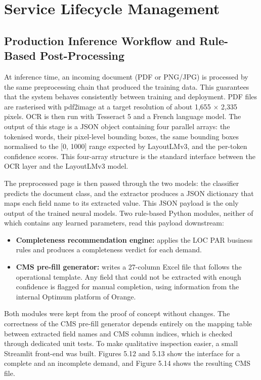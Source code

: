 \section{Service Lifecycle Management}

\subsection{Production Inference Workflow and Rule-Based Post-Processing}

At inference time, an incoming document (PDF or PNG/JPG) is processed by the same preprocessing chain that produced the training data. This guarantees that the system behaves consistently between training and deployment. PDF files are rasterised with pdf2image at a target resolution of about 1,655 $\times$ 2,335 pixels. OCR is then run with Tesseract 5 and a French language model. The output of this stage is a JSON object containing four parallel arrays: the tokenised words, their pixel-level bounding boxes, the same bounding boxes normalised to the [0, 1000] range expected by LayoutLMv3, and the per-token confidence scores. This four-array structure is the standard interface between the OCR layer and the LayoutLMv3 model.

The preprocessed page is then passed through the two models: the classifier predicts the document class, and the extractor produces a JSON dictionary that maps each field name to its extracted value. This JSON payload is the only output of the trained neural models. Two rule-based Python modules, neither of which contains any learned parameters, read this payload downstream:

\begin{itemize}
  \item \textbf{Completeness recommendation engine:} applies the LOC PAR business rules and produces a completeness verdict for each demand.
  \item \textbf{CMS pre-fill generator:} writes a 27-column Excel file that follows the operational template. Any field that could not be extracted with enough confidence is flagged for manual completion, using information from the internal Optimum platform of Orange.
\end{itemize}

Both modules were kept from the proof of concept without changes. The correctness of the CMS pre-fill generator depends entirely on the mapping table between extracted field names and CMS column indices, which is checked through dedicated unit tests. To make qualitative inspection easier, a small Streamlit front-end was built. Figures 5.12 and 5.13 show the interface for a complete and an incomplete demand, and Figure 5.14 shows the resulting CMS file.

